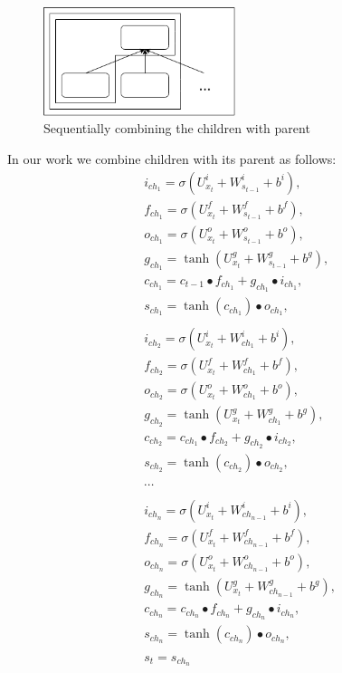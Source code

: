 \documentclass[10pt, a4paper]{article}
\begin{document}
\begin{figure}[h]
	 \begin{center}
    	\includegraphics[width=0.5\textwidth]{sequentialchild}
		\caption{Sequentially combining the children with parent}
	 \end{center}
\end{figure}
	In our work we combine children with its parent as follows:
\begin{equation}
\begin{split}
&i_{ch_1} = \sigma(U_{x_t}^i + W_{s_{t-1}}^i + b^i) ,\\
&f_{ch_1} = \sigma(U_{x_t}^f + W_{s_{t-1}}^f + b^f) ,\\
&o_{ch_1} = \sigma(U_{x_t}^o + W_{s_{t-1}}^o + b^o) ,\\
&g_{ch_1} = \tanh(U_{x_t}^g+ W_{s_{t-1}}^g + b^g) ,\\
&c_{ch_1} = c_{t-1} \bullet f_{ch_1} + g_{ch_1} \bullet i_{ch_1} ,\\
&s_{ch_1} = \tanh({c_{ch_1}}) \bullet o_{ch_1},\\\\
&i_{ch_2} = \sigma(U_{x_t}^i + W_{ch_1}^i + b^i) ,\\
&f_{ch_2} = \sigma(U_{x_t}^f + W_{ch_1}^f + b^f) ,\\
&o_{ch_2} = \sigma(U_{x_t}^o + W_{ch_1}^o + b^o) ,\\
&g_{ch_2} = \tanh(U_{x_t}^g+ W_{ch_1}^g + b^g) ,\\
&c_{ch_2} = c_{ch_1} \bullet f_{ch_2} + g_{ch_2} \bullet i_{ch_2} ,\\
&s_{ch_2} = \tanh(c_{ch_2}) \bullet o_{ch_2},\\\\
&\cdots\\\\
&i_{ch_n} = \sigma(U_{x_t}^i + W_{ch_{n-1}}^i + b^i) ,\\
&f_{ch_n} = \sigma(U_{x_t}^f + W_{ch_{n-1}}^f + b^f) ,\\
&o_{ch_n} = \sigma(U_{x_t}^o + W_{ch_{n-1}}^o + b^o) ,\\
&g_{ch_n} = \tanh(U_{x_t}^g+ W_{ch_{n-1}}^g + b^g) ,\\
&c_{ch_n} = c_{ch_n} \bullet f_{ch_n} + g_{ch_n} \bullet i_{ch_n} ,\\
&s_{ch_n} = \tanh(c_{ch_n}) \bullet o_{ch_n},\\\\
&s_{t} = s_{ch_n}
\end{split}
\end{equation}
\end{document}
